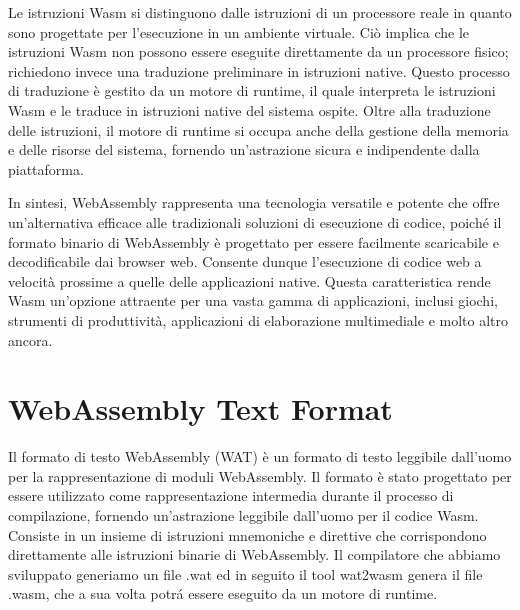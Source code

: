 \documentclass[../../main.tex]{subfiles}
\begin{document}
Le istruzioni Wasm si distinguono dalle istruzioni di un processore reale in quanto sono progettate per l'esecuzione in un ambiente virtuale. Ciò implica che le istruzioni Wasm non possono essere eseguite direttamente da un processore fisico; richiedono invece una traduzione preliminare in istruzioni native. Questo processo di traduzione è gestito da un motore di runtime, il quale interpreta le istruzioni Wasm e le traduce in istruzioni native del sistema ospite. Oltre alla traduzione delle istruzioni, il motore di runtime si occupa anche della gestione della memoria e delle risorse del sistema, fornendo un'astrazione sicura e indipendente dalla piattaforma.

In sintesi, WebAssembly rappresenta una tecnologia versatile e potente che offre un'alternativa efficace alle tradizionali soluzioni di esecuzione di codice, poiché il formato binario di WebAssembly è progettato per essere facilmente scaricabile e decodificabile dai browser web. Consente dunque l'esecuzione di codice web a velocità prossime a quelle delle applicazioni native. Questa caratteristica rende Wasm un'opzione attraente per una vasta gamma di applicazioni, inclusi giochi, strumenti di produttività, applicazioni di elaborazione multimediale e molto altro ancora.\autocite{WebAssemblyDoc}

\section{WebAssembly Text Format}
Il formato di testo WebAssembly (WAT) \autocite{WebAssemblyTextFormat} è un formato di testo leggibile dall'uomo per la rappresentazione di moduli WebAssembly. Il formato è stato progettato per essere utilizzato come rappresentazione intermedia durante il processo di compilazione, fornendo un'astrazione leggibile dall'uomo per il codice Wasm.
Consiste in un insieme di istruzioni mnemoniche e direttive che corrispondono direttamente alle istruzioni binarie di WebAssembly.
Il compilatore che abbiamo sviluppato generiamo un file .wat ed in seguito il tool wat2wasm \autocite{jain2022webassembly} genera il file .wasm, che a sua volta potrá essere eseguito da un motore di runtime.
\end{document}
